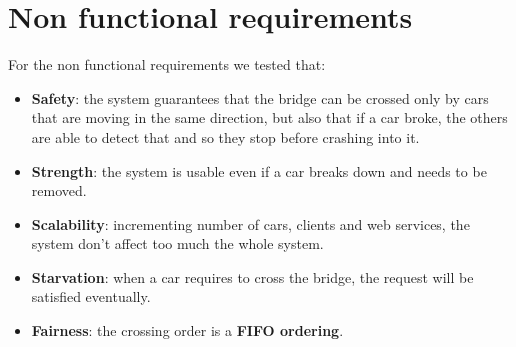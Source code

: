\section{Non functional requirements}

For the non functional requirements we tested that:
\begin{itemize}
    \item \textbf{Safety}: the system guarantees that the bridge can be crossed only by cars that 
        are moving in the same direction, but also that if a car broke, the others are able to detect that
        and so they stop before crashing into it. 
    \item \textbf{Strength}: the system is usable even if a car breaks down and needs to be removed.
    \item \textbf{Scalability}: incrementing number of cars, clients and web services, the system don't affect
    too much the whole system.
    \item \textbf{Starvation}: when a car requires to cross the bridge, the request will be satisfied 
    eventually. 
    \item \textbf{Fairness}: the crossing order is a \textbf{FIFO ordering}.
\end{itemize}

